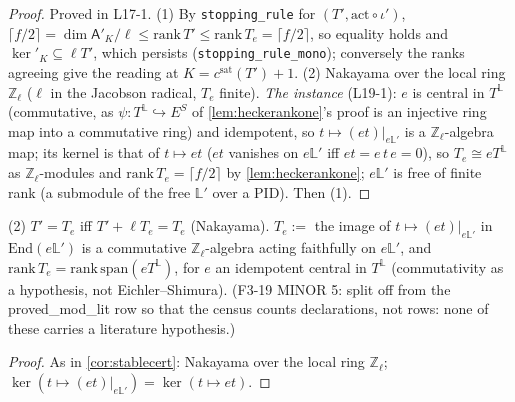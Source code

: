 \begin{proof}
  \leanok
  Proved in L17-1. (1) By \texttt{stopping\_rule} for $(T',\mathrm{act}\circ\iota')$, $\lceil f/2\rceil=\dim\mathsf A'_K/\ell\le\mathrm{rank}\,T'
  \le\mathrm{rank}\,T_e=\lceil f/2\rceil$, so equality holds and $\ker'_K\subseteq\ell T'$, which persists (\texttt{stopping\_rule\_mono});
  conversely the ranks agreeing give the reading at $K=c^{\mathrm{sat}}(T')+1$. (2) Nakayama over the local ring $\mathbb Z_\ell$
  ($\ell$ in the Jacobson radical, $T_e$ finite). \emph{The instance} (L19-1): $e$ is central in $T^{\mathbb L}$ (commutative, as
  $\psi:T^{\mathbb L}\hookrightarrow E^S$ of \ref{lem:heckerankone}'s proof is an injective ring map into a commutative ring) and
  idempotent, so $t\mapsto(et)|_{e\mathbb L'}$ is a $\mathbb Z_\ell$-algebra map; its kernel is that of $t\mapsto et$ ($et$ vanishes on
  $e\mathbb L'$ iff $et=e\,t\,e=0$), so $T_e\cong eT^{\mathbb L}$ as $\mathbb Z_\ell$-modules and $\mathrm{rank}\,T_e=\lceil f/2\rceil$ by
  \ref{lem:heckerankone}; $e\mathbb L'$ is free of finite rank (a submodule of the free $\mathbb L'$ over a PID). Then (1).
\end{proof}

\begin{corollary}\label{cor:stablecert-uncond}
  \leanok
  (2) $T'=T_e$ iff $T'+\ell T_e=T_e$ (Nakayama). $T_e:=$ the image of $t\mapsto(et)|_{e\mathbb L'}$ in $\mathrm{End}(e\mathbb L')$ is a
  commutative $\mathbb Z_\ell$-algebra acting faithfully on $e\mathbb L'$, and $\mathrm{rank}\,T_e=\mathrm{rank}\,\mathrm{span}(eT^{\mathbb L})$,
  for $e$ an idempotent central in $T^{\mathbb L}$ (commutativity as a hypothesis, not Eichler--Shimura). (F3-19 MINOR 5: split off from the \textsf{proved\_mod\_lit} row so that the census counts declarations, not rows: none of these carries a literature hypothesis.)
\end{corollary}
\begin{proof}
  \leanok
  As in \ref{cor:stablecert}: Nakayama over the local ring $\mathbb Z_\ell$; $\ker(t\mapsto(et)|_{e\mathbb L'})=\ker(t\mapsto et)$.
\end{proof}

